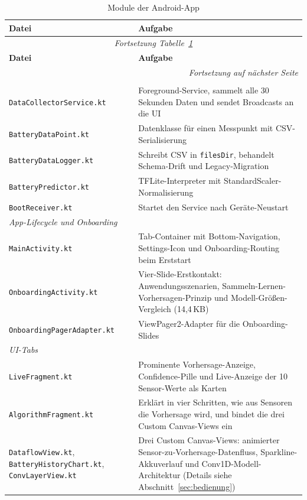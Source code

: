 \documentclass[12pt, a4paper, ngerman]{article}
\newcommand{\code}[1]{\texttt{#1}}
\newcommand{\datei}[1]{\texttt{\small #1}}
\begin{document}
{\small
\renewcommand{\arraystretch}{1.25}
\begin{longtable}{p{5cm}p{10cm}}
\caption{Module der Android-App}
\label{tab:android_module} \\
\toprule
\textbf{Datei} & \textbf{Aufgabe} \\
\midrule
\endfirsthead
\multicolumn{2}{c}{\itshape Fortsetzung Tabelle~\ref{tab:android_module}} \\
\toprule
\textbf{Datei} & \textbf{Aufgabe} \\
\midrule
\endhead
\midrule
\multicolumn{2}{r}{\itshape Fortsetzung auf nächster Seite} \\
\endfoot
\bottomrule
\endlastfoot
\multicolumn{2}{l}{\textit{Datenerhebung und Modell}} \\
\datei{DataCollectorService.kt} & Foreground-Service, sammelt alle 30 Sekunden Daten und sendet Broadcasts an die UI \\
\datei{BatteryDataPoint.kt}     & Datenklasse für einen Messpunkt mit CSV-Serialisierung \\
\datei{BatteryDataLogger.kt}    & Schreibt CSV in \code{filesDir}, behandelt Schema-Drift und Legacy-Migration \\
\datei{BatteryPredictor.kt}     & TFLite-Interpreter mit StandardScaler-Normalisierung \\
\datei{BootReceiver.kt}         & Startet den Service nach Geräte-Neustart \\
\midrule
\multicolumn{2}{l}{\textit{App-Lifecycle und Onboarding}} \\
\datei{MainActivity.kt}         & Tab-Container mit Bottom-Navigation, Settings-Icon und Onboarding-Routing beim Erststart \\
\datei{OnboardingActivity.kt}   & Vier-Slide-Erstkontakt: Anwendungsszenarien, Sammeln-Lernen-Vorhersagen-Prinzip und Modell-Größen-Vergleich (14,4\,KB) \\
\datei{OnboardingPagerAdapter.kt} & ViewPager2-Adapter für die Onboarding-Slides \\
\midrule
\multicolumn{2}{l}{\textit{UI-Tabs}} \\
\datei{LiveFragment.kt}         & Prominente Vorhersage-Anzeige, Confidence-Pille und Live-Anzeige der 10 Sensor-Werte als Karten \\
\datei{AlgorithmFragment.kt}    & Erklärt in vier Schritten, wie aus Sensoren die Vorhersage wird, und bindet die drei Custom Canvas-Views ein \\
\datei{DataflowView.kt}, \datei{BatteryHistoryChart.kt}, \datei{ConvLayerView.kt} & Drei Custom Canvas-Views: animierter Sensor-zu-Vorhersage-Datenfluss, Sparkline-Akkuverlauf und Conv1D-Modell-Architektur (Details siehe Abschnitt~\ref{sec:bedienung}) \\

\end{longtable}}
\end{document}
